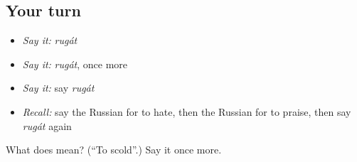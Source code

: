 \subsection*{Your turn}
\begin{itemize}
\raggedright
  \item \emph{Say it:} \emph{rugát}
  \item \emph{Say it:} \emph{rugát}, once more
  \item \emph{Say it:} say \emph{rugát}
  \item \emph{Recall:} say the Russian for to hate, then the Russian for to praise, then say \emph{rugát} again
\end{itemize}

\begin{tcolorbox}[breakable,colback=teal!4,colframe=teal!35!black,title={Before you move on}]
What does  mean? (\textquotedblleft{}To scold\textquotedblright{}.) Say it once more.
\end{tcolorbox}
